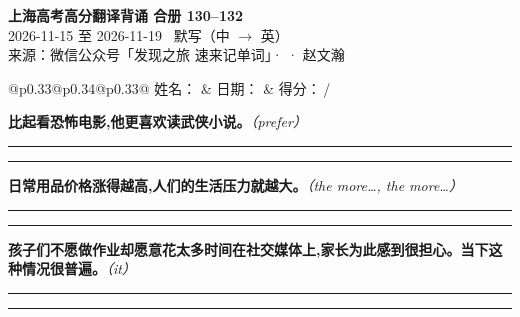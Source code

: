 \documentclass[11pt,a4paper]{article}
\newcommand{\num}[1]{\makebox[1.9em][r]{#1.}\hspace{0.3em}}
\newcommand{\wline}{\noindent\rule{\linewidth}{0.4pt}}
\newcommand{\prompt}[1]{\emph{\textcolor{tipblue}{\small（#1）}}}
\begin{document}
\pagestyle{plain}
\begin{center}
{\LARGE\bfseries 上海高考高分翻译背诵 \quad 合册 130–132}\\[0.25em]
{\large 2026-11-15 至 2026-11-19 \quad\ 默写（中 $\to$ 英）}\\[0.35em]
{\footnotesize 来源：微信公众号「发现之旅 速来记单词」·  · 赵文瀚}
\end{center}

\vspace{0.4em}
\noindent\begin{tabular}{@{}p{0.33\textwidth}@{}p{0.34\textwidth}@{}p{0.33\textwidth}@{}}
姓名：\underline{\hspace{2.0cm}} & 日期：\underline{\hspace{2.0cm}} & 得分：\underline{\hspace{1.4cm}}\,/ \\
\end{tabular}

\vspace{0.5em}

\vspace{0.8em}
\vspace{0.35em}\vspace{0.15em}

\begin{minipage}{\linewidth}

\num{1}\textbf{比起看恐怖电影,他更喜欢读武侠小说。}\prompt{prefer}

\vspace{0.3em}

\wline\vspace{0.3em}
\wline

\end{minipage}

\begin{minipage}{\linewidth}

\num{2}\textbf{日常用品价格涨得越高,人们的生活压力就越大。}\prompt{the more…, the more…}

\vspace{0.3em}

\wline\vspace{0.3em}
\wline

\end{minipage}

\begin{minipage}{\linewidth}

\num{3}\textbf{孩子们不愿做作业却愿意花太多时间在社交媒体上,家长为此感到很担心。当下这种情况很普遍。}\prompt{it}

\vspace{0.3em}

\wline\vspace{0.3em}
\wline

\end{minipage}
\end{document}
